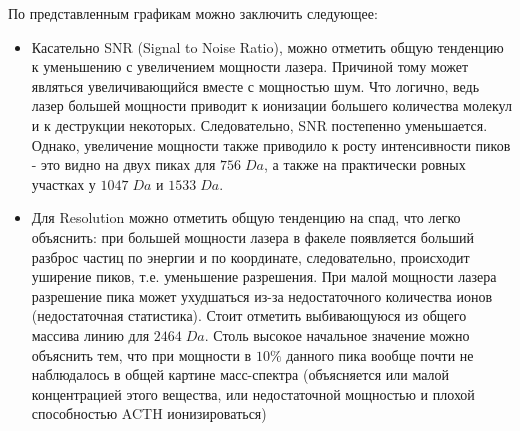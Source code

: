 \documentclass{article}
\begin{document}
По представленным графикам можно заключить следующее:
\begin{itemize}
    \item Касательно SNR (Signal to Noise Ratio), можно отметить общую тенденцию к уменьшению с увеличением мощности лазера. Причиной тому может являться увеличивающийся вместе с мощностью шум. Что логично, ведь лазер большей мощности приводит к ионизации большего количества молекул и к деструкции некоторых. Следовательно, SNR постепенно уменьшается. Однако, увеличение мощности также приводило к росту интенсивности пиков - это видно на двух пиках для $756 \; Da$, а также на практически ровных участках у $1047 \; Da$ и $1533 \; Da$. 
    \item Для Resolution можно отметить общую тенденцию на спад, что легко объяснить: при большей мощности лазера в факеле появляется больший разброс частиц по энергии и по координате, следовательно, происходит уширение пиков, т.е. уменьшение разрешения. При малой мощности лазера разрешение пика может ухудшаться из-за недостаточного количества ионов (недостаточная статистика). Стоит отметить выбивающуюся из общего массива линию для $2464 \; Da$. Столь высокое начальное значение можно объяснить тем, что при мощности в $10 \%$ данного пика вообще почти не наблюдалось в общей картине масс-спектра (объясняется или малой концентрацией этого вещества, или недостаточной мощностью и плохой способностью ACTH ионизироваться) 
\end{itemize}
\end{document}
